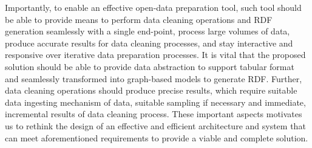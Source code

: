 Importantly, to enable an effective open-data preparation tool, such tool should be able to provide means to perform data cleaning operations and RDF generation seamlessly with a single end-point, process large volumes of data, produce accurate results for data cleaning processes, and stay interactive and responsive over iterative data preparation processes. It is vital that the proposed solution should be able to provide data abstraction to support tabular format and seamlessly transformed into graph-based models to generate RDF. Further, data cleaning operations should produce precise results, which require suitable data ingesting mechanism of data, suitable sampling if necessary and immediate, incremental results of data cleaning process. These important aspects motivates us to rethink the design of an effective and efficient architecture and system that can meet aforementioned requirements to provide a viable and complete solution.  

